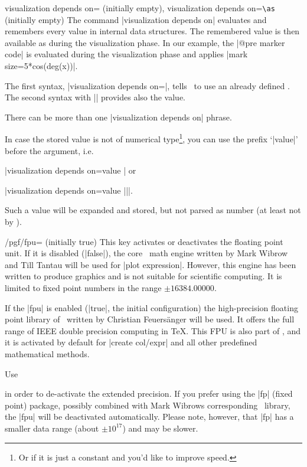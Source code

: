 \begin{pgfplotskeylist}{%
	visualization depends on= (initially empty),%
	visualization depends on=\texttt{\textbackslash as} (initially empty)}
	The command |visualization depends on| evaluates and remembers every value in internal data structures. The remembered value is then available as  during the visualization phase. In our example, the |@pre marker code| is evaluated during the visualization phase and applies |mark size=5*cos(deg(x))|.
	
	The first syntax, |visualization depends on=|, tells \PGFPlots\ to use an already defined . The second syntax with |\as| provides also the value.

	There can be more than one |visualization depends on| phrase.

	In case the stored value is not of numerical type\footnote{Or if it is just a constant and you'd like to improve speed.}, you can use the prefix `|value|' before the argument, i.e.

	|visualization depends on=value | or

	|visualization depends on=value ||\as |.

	Such a value will be expanded and stored, but not parsed as number (at least not by \PGFPlots).
\end{pgfplotskeylist}

\begin{key}{/pgf/fpu= (initially true)}
	This key activates or deactivates the floating point unit. If it is disabled (|false|), the core \PGF\ math engine written by Mark Wibrow and Till Tantau will be used for |plot expression|.
	However, this engine has been written to produce graphics and is not suitable for scientific computing. It is limited to fixed point numbers in the range $\pm 16384.00000$.

	If the |fpu| is enabled (|true|, the initial configuration) the high-precision floating point library of \PGF\ written by Christian Feuers\"anger will be used. It offers the full range of IEEE double precision computing in \TeX. This FPU is also part of \PGFPlotstable, and it is activated by default for |create col/expr| and all other predefined mathematical methods.

	Use
\begin{codeexample}
\end{codeexample}
	\noindent in order to de-activate the extended precision. If you prefer using the |fp| (fixed point) package, possibly combined with Mark Wibrows corresponding \PGF\ library, the |fpu| will be deactivated automatically. Please note, however, that |fp| has a smaller data range (about $\pm 10^{17}$) and may be slower.
\end{key}
